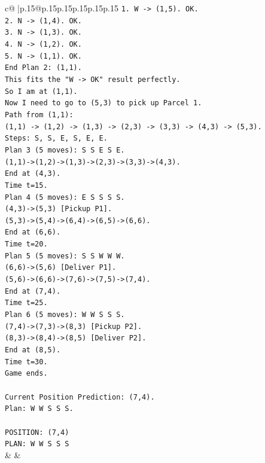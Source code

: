 \documentclass{article}
\begin{document}
{\begin{supertabular}{c@{$\;$}|p{.15\linewidth}@{}p{.15\linewidth}p{.15\linewidth}p{.15\linewidth}p{.15\linewidth}p{.15\linewidth}}
{{{\texttt{1. W {-}> (1,5). OK.} \\
\texttt{2. N {-}> (1,4). OK.} \\
\texttt{3. N {-}> (1,3). OK.} \\
\texttt{4. N {-}> (1,2). OK.} \\
\texttt{5. N {-}> (1,1). OK.} \\
\texttt{End Plan 2: (1,1).} \\
\texttt{This fits the "W {-}> OK" result perfectly.} \\
\texttt{So I am at (1,1).} \\
\texttt{Now I need to go to (5,3) to pick up Parcel 1.} \\
\texttt{Path from (1,1):} \\
\texttt{(1,1) {-}> (1,2) {-}> (1,3) {-}> (2,3) {-}> (3,3) {-}> (4,3) {-}> (5,3).} \\
\texttt{Steps: S, S, E, S, E, E.} \\
\texttt{Plan 3 (5 moves): S S E S E.} \\
\texttt{(1,1){-}>(1,2){-}>(1,3){-}>(2,3){-}>(3,3){-}>(4,3).} \\
\texttt{End at (4,3).} \\
\texttt{Time t=15.} \\
\texttt{Plan 4 (5 moves): E S S S S.} \\
\texttt{(4,3){-}>(5,3) {[}Pickup P1{]}.} \\
\texttt{(5,3){-}>(5,4){-}>(6,4){-}>(6,5){-}>(6,6).} \\
\texttt{End at (6,6).} \\
\texttt{Time t=20.} \\
\texttt{Plan 5 (5 moves): S S W W W.} \\
\texttt{(6,6){-}>(5,6) {[}Deliver P1{]}.} \\
\texttt{(5,6){-}>(6,6){-}>(7,6){-}>(7,5){-}>(7,4).} \\
\texttt{End at (7,4).} \\
\texttt{Time t=25.} \\
\texttt{Plan 6 (5 moves): W W S S S.} \\
\texttt{(7,4){-}>(7,3){-}>(8,3) {[}Pickup P2{]}.} \\
\texttt{(8,3){-}>(8,4){-}>(8,5) {[}Deliver P2{]}.} \\
\texttt{End at (8,5).} \\
\texttt{Time t=30.} \\
\texttt{Game ends.} \\
\\ 
\texttt{Current Position Prediction: (7,4).} \\
\texttt{Plan: W W S S S.} \\
\\ 
\texttt{POSITION: (7,4)} \\
\texttt{PLAN: W W S S S} \\
            }
        }
    }
    & & \\ \\


\end{supertabular}}
\end{document}
